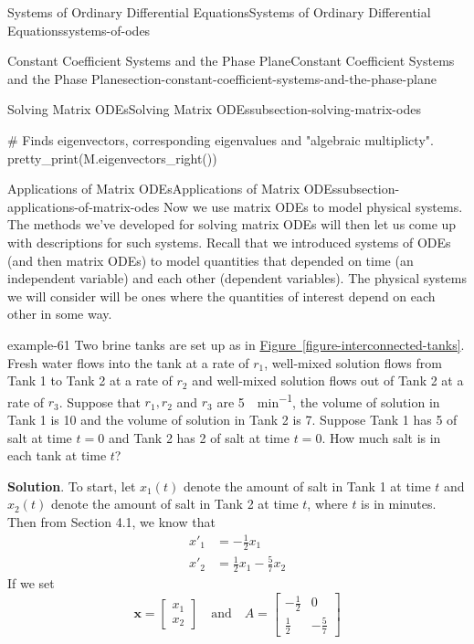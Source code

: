 \documentclass[oneside,10pt,]{book}
\numberwithin{equation}{section}
\renewcommand{\vec}[1]{\mathbf{#1}}
\newcommand{\qq}[1]{\quad\text{#1}\quad}
\newcommand{\amp}{&}
\begin{document}
\begin{chapterptx}{Systems of Ordinary Differential Equations}{}{Systems of Ordinary Differential Equations}{}{}{systems-of-odes}
\begin{sectionptx}{Constant Coefficient Systems and the Phase Plane}{}{Constant Coefficient Systems and the Phase Plane}{}{}{section-constant-coefficient-systems-and-the-phase-plane}
\begin{subsectionptx}{Solving Matrix ODEs}{}{Solving Matrix ODEs}{}{}{subsection-solving-matrix-odes}
\begin{sageinput}
# Finds eigenvectors, corresponding eigenvalues and "algebraic multiplicty".
pretty_print(M.eigenvectors_right())
\end{sageinput}
\end{subsectionptx}
%
%
\typeout{************************************************}
\typeout{************************************************}
%
\begin{subsectionptx}{Applications of Matrix ODEs}{}{Applications of Matrix ODEs}{}{}{subsection-applications-of-matrix-odes}
\hypertarget{p-359}{}%
Now we use matrix ODEs to model physical systems. The methods we've developed for solving matrix ODEs will then let us come up with descriptions for such systems. Recall that we introduced systems of ODEs (and then matrix ODEs) to model quantities that depended on time (an independent variable) and each other (dependent variables). The physical systems we will consider will be ones where the quantities of interest depend on each other in some way.%
\begin{example}{}{example-61}%
\hypertarget{p-360}{}%
Two brine tanks are set up as in \hyperref[figure-interconnected-tanks]{Figure~\ref{figure-interconnected-tanks}}. Fresh water flows into the tank at a rate of \(r_{1}\), well-mixed solution flows from Tank 1 to Tank 2 at a rate of \(r_{2}\) and well-mixed solution flows out of Tank 2 at a rate of \(r_{3}\). Suppose that \(r_{1}, r_{2}\) and  \(r_{3}\) are \SI{5}{\gallon\per\minute}, the volume of solution in Tank 1 is \SI{10}{\gallon} and the volume of solution in Tank 2 is \SI{7}{\gallon}. Suppose Tank 1 has \SI{5}{\pound} of salt at time \(t=0\) and Tank 2 has \SI{2}{\pound} of salt at time \(t=0\). How much salt is in each tank at time \(t\)?%
\par\smallskip%
\noindent\textbf{Solution}.\hypertarget{solution-58}{}\quad%
\hypertarget{p-361}{}%
To start, let \(x_{1}(t)\) denote the amount of salt in Tank 1 at time \(t\) and \(x_{2}(t)\) denote the amount of salt in Tank 2 at time \(t\), where \(t\) is in minutes. Then from Section 4.1, we know that%
\begin{align*}
x'_{1} \amp = -\frac{1}{2}x_{1}\\
x'_{2} \amp = \frac{1}{2}x_{1}-\frac{5}{7}x_{2}
\end{align*}
If we set%
\begin{equation*}
\vec{x} = \begin{bmatrix} x_{1} \\ x_{2} \end{bmatrix} \qq{and} A = \begin{bmatrix}-\frac{1}{2} \amp  0 \\ \frac{1}{2} \amp  -\frac{5}{7}\end{bmatrix}

\end{equation*}
\end{example}
\end{subsectionptx}
\end{sectionptx}
\end{chapterptx}
\end{document}
